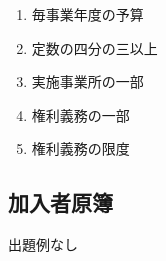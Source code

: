 \begin{answerbox}
  \begin{enumerate}[A:]
    \item 毎事業年度の予算
    \item 定数の四分の三以上
    \item 実施事業所の一部
    \item 権利義務の一部
    \item 権利義務の限度
  \end{enumerate}
\end{answerbox}

\newpage

\subsection{加入者原簿}

出題例なし

\newpage
